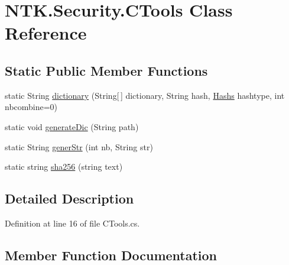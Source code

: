 \hypertarget{class_n_t_k_1_1_security_1_1_c_tools}{}\section{N\+T\+K.\+Security.\+C\+Tools Class Reference}
\label{class_n_t_k_1_1_security_1_1_c_tools}
\subsection*{Static Public Member Functions}
\begin{DoxyCompactItemize}
\item 
static String \mbox{\hyperlink{class_n_t_k_1_1_security_1_1_c_tools_adafc7d798f2e6f1c858c12e5c85e1979}{dictionary}} (String\mbox{[}$\,$\mbox{]} dictionary, String hash, \mbox{\hyperlink{namespace_n_t_k_1_1_security_a7900638efc67a146821e4c0bff855eb1}{Hashs}} hashtype, int nbcombine=0)
\item 
static void \mbox{\hyperlink{class_n_t_k_1_1_security_1_1_c_tools_a6c3d2bec1ec15a7b20dc83f5f50bed6f}{generate\+Dic}} (String path)
\item 
static String \mbox{\hyperlink{class_n_t_k_1_1_security_1_1_c_tools_a2ce591edf4dc18161d1a8e27ff43d149}{gener\+Str}} (int nb, String str)
\item 
static string \mbox{\hyperlink{class_n_t_k_1_1_security_1_1_c_tools_ae2da5a3353e281bb618133d2344f1e91}{sha256}} (string text)
\end{DoxyCompactItemize}


\subsection{Detailed Description}


Definition at line 16 of file C\+Tools.\+cs.



\subsection{Member Function Documentation}
\mbox{\label{class_n_t_k_1_1_security_1_1_c_tools_adafc7d798f2e6f1c858c12e5c85e1979}} 
